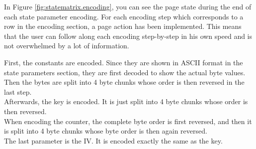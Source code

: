 In Figure \ref{fig:statematrix.encoding}, you can see the page state during the end of each state parameter encoding. For each encoding step which corresponds to a row in the encoding section, a page action has been implemented. This means that the user can follow along each encoding step-by-step in his own speed and is not overwhelmed by a lot of information.

First, the constants are encoded. Since they are shown in ASCII format in the state parameters section, they are first decoded to show the actual byte values. Then the 
bytes are split into 4 byte chunks whose order is then reversed in the last step. \\
Afterwards, the key is encoded. It is just split into 4 byte chunks whose order is then reversed. \\
When encoding the counter, the complete byte order is first reversed, and then it is split into 4 byte chunks whose byte order is then again reversed. \\
The last parameter is the IV. It is encoded exactly the same as the key. \\

